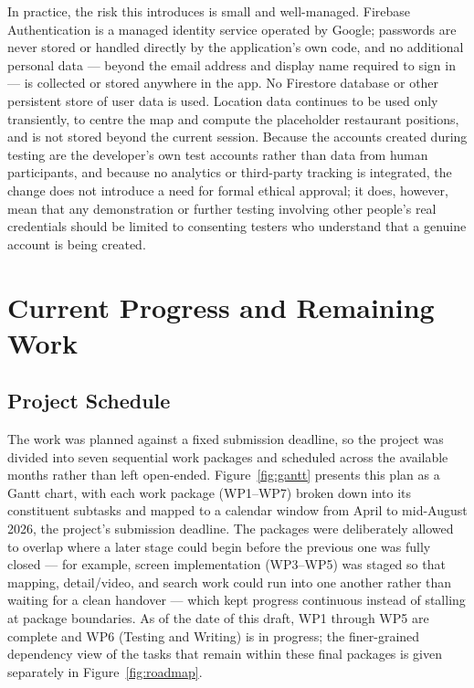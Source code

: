 \documentclass[12pt, a4paper]{article}
\begin{document}
In practice, the risk this introduces is small and well-managed. Firebase Authentication is a managed identity service operated by Google; passwords are never stored or handled directly by the application's own code, and no additional personal data — beyond the email address and display name required to sign in — is collected or stored anywhere in the app. No Firestore database or other persistent store of user data is used. Location data continues to be used only transiently, to centre the map and compute the placeholder restaurant positions, and is not stored beyond the current session. Because the accounts created during testing are the developer's own test accounts rather than data from human participants, and because no analytics or third-party tracking is integrated, the change does not introduce a need for formal ethical approval; it does, however, mean that any demonstration or further testing involving other people's real credentials should be limited to consenting testers who understand that a genuine account is being created.

\section{Current Progress and Remaining Work}

\subsection{Project Schedule}

The work was planned against a fixed submission deadline, so the project was divided into seven sequential work packages and scheduled across the available months rather than left open-ended. Figure~\ref{fig:gantt} presents this plan as a Gantt chart, with each work package (WP1--WP7) broken down into its constituent subtasks and mapped to a calendar window from April to mid-August 2026, the project's submission deadline. The packages were deliberately allowed to overlap where a later stage could begin before the previous one was fully closed --- for example, screen implementation (WP3--WP5) was staged so that mapping, detail/video, and search work could run into one another rather than waiting for a clean handover --- which kept progress continuous instead of stalling at package boundaries. As of the date of this draft, WP1 through WP5 are complete and WP6 (Testing and Writing) is in progress; the finer-grained dependency view of the tasks that remain within these final packages is given separately in Figure~\ref{fig:roadmap}.
\end{document}
